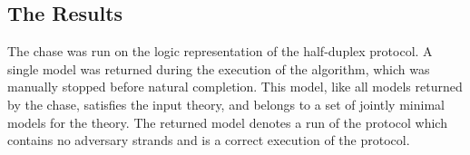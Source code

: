 	\subsection{The Results}

		The chase was run on the logic representation of the half-duplex protocol.
		A single model was returned during the execution of the algorithm,
		which was manually stopped before natural completion. This model, like
		all models returned by the chase, satisfies the input theory, and
		belongs to a set of jointly minimal models for the theory. The returned
		model denotes a run of the protocol which contains no adversary strands
		and is a correct execution of the protocol.
